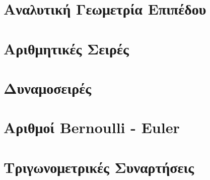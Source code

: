 

\chapter{Αναλυτική Γεωμετρία Επιπέδου}



\chapter{Αριθμητικές Σειρές}



\chapter{Δυναμοσειρές}



\chapter{Αριθμοί \textlatin{Bernoulli - Euler}}



\chapter{Τριγωνομετρικές Συναρτήσεις}







